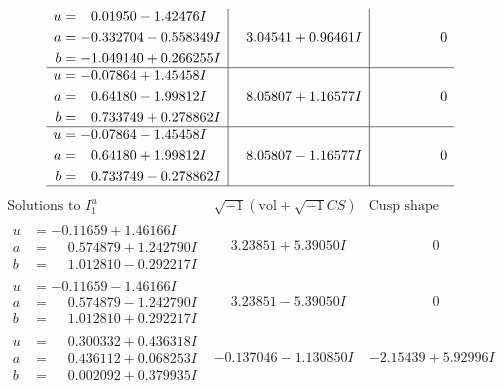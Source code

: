 \documentclass[1p]{elsarticle_modified}
\theoremstyle{definition}
\newcommand{\I}{\sqrt{-1}}
\begin{document}
$$\begin{array}{c|c|c}
\begin{aligned}
u &= \phantom{-}0.01950 - 1.42476 I \\
a &= -0.332704 - 0.558349 I \\
b &= -1.049140 + 0.266255 I\end{aligned}
 & \phantom{-}3.04541 + 0.96461 I & \phantom{-0.000000 } 0 \\ \hline\begin{aligned}
u &= -0.07864 + 1.45458 I \\
a &= \phantom{-}0.64180 - 1.99812 I \\
b &= \phantom{-}0.733749 + 0.278862 I\end{aligned}
 & \phantom{-}8.05807 + 1.16577 I & \phantom{-0.000000 } 0 \\ \hline\begin{aligned}
u &= -0.07864 - 1.45458 I \\
a &= \phantom{-}0.64180 + 1.99812 I \\
b &= \phantom{-}0.733749 - 0.278862 I\end{aligned}
 & \phantom{-}8.05807 - 1.16577 I & \phantom{-0.000000 } 0\\
 \hline 
 \end{array}$$\newpage$$\begin{array}{c|c|c}  
\text{Solutions to }I^u_{1}& \I (\text{vol} + \sqrt{-1}CS) & \text{Cusp shape}\\
 \hline 
\begin{aligned}
u &= -0.11659 + 1.46166 I \\
a &= \phantom{-}0.574879 + 1.242790 I \\
b &= \phantom{-}1.012810 - 0.292217 I\end{aligned}
 & \phantom{-}3.23851 + 5.39050 I & \phantom{-0.000000 } 0 \\ \hline\begin{aligned}
u &= -0.11659 - 1.46166 I \\
a &= \phantom{-}0.574879 - 1.242790 I \\
b &= \phantom{-}1.012810 + 0.292217 I\end{aligned}
 & \phantom{-}3.23851 - 5.39050 I & \phantom{-0.000000 } 0 \\ \hline\begin{aligned}
u &= \phantom{-}0.300332 + 0.436318 I \\
a &= \phantom{-}0.436112 + 0.068253 I \\
b &= \phantom{-}0.002092 + 0.379935 I\end{aligned}
 & -0.137046 - 1.130850 I & -2.15439 + 5.92996 I \\ \hline\begin{aligned}

\end{aligned}
\end{array}$$
\end{document}

